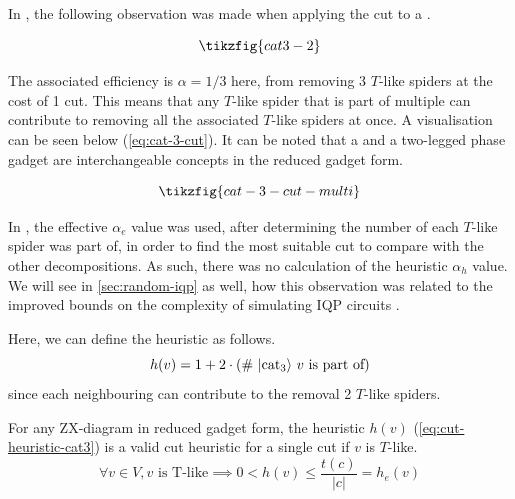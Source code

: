 In \cite{Codsi2022}, the following observation was made when applying the cut to a .

\begin{equation}
    \tikzfig{cat3-2}
\end{equation}

The associated efficiency is $\alpha = 1/3$ here, from removing 3 $T$-like spiders at the cost of 1 cut.
This means that any $T$-like spider that is part of multiple  can contribute to removing
all the associated $T$-like spiders at once.
A visualisation can be seen below (\ref{eq:cat-3-cut}).
It can be noted that a  and a two-legged phase gadget are interchangeable concepts
in the reduced gadget form.

\begin{equation}
    \label{eq:cat-3-cut}
    \tikzfig{cat-3-cut-multi}
\end{equation}

In \cite{Codsi2022}, the effective $\alpha_e$ value was used, 
after determining the number of  each $T$-like spider was part of,
in order to find the most suitable cut to compare with the other decompositions.
As such, there was no calculation of the heuristic $\alpha_h$ value.
We will see in \autoref{sec:random-iqp} as well, how this observation was related to the improved bounds
on the complexity of simulating IQP circuits \cite{codsi2023}.

Here, we can define the heuristic as follows.
\begin{equation}
    \label{eq:cut-heuristic-cat3}
    h(v) = 1 + 2 \cdot (\text{\# \ensuremath{\left| \text{cat}_{3} \right\rangle} $v$ is part of})
\end{equation}
since each neighbouring  can contribute to the removal 2 $T$-like spiders.

\begin{proposition}
    For any ZX-diagram in reduced gadget form, the heuristic $h(v)$ (\ref{eq:cut-heuristic-cat3}) 
    is a valid cut heuristic for a single cut if $v$ is $T$-like.
    \[\forall v\in V, v \text{ is T-like} \implies 0 < h(v) \leq \frac{t(c)}{|c|} = h_e(v)\]
\end{proposition}

